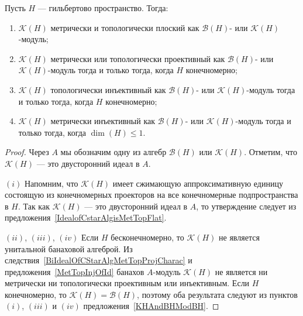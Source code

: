 \begin{proposition}\label{KHAndBHModKH} Пусть $H$ --- гильбертово пространство.
Тогда:

\begin{enumerate}[label = (\roman*)]
    \item $\mathcal{K}(H)$ метрически и топологически плоский 
    как $\mathcal{B}(H)$- или $\mathcal{K}(H)$-модуль;

    \item $\mathcal{K}(H)$ метрически или топологически проективный как
    $\mathcal{B}(H)$- или $\mathcal{K}(H)$-модуль тогда и только 
    тогда, когда $H$ конечномерно;

    \item $\mathcal{K}(H)$ топологически инъективный как $\mathcal{B}(H)$- или
    $\mathcal{K}(H)$-модуль тогда и только тогда, когда $H$ конечномерно;

    \item $\mathcal{K}(H)$ метрически инъективный как $\mathcal{B}(H)$- или
    $\mathcal{K}(H)$-модуль тогда и только тогда, когда $\dim(H)\leq 1$.
\end{enumerate}
\end{proposition}
\begin{proof} Через $A$ мы обозначим одну из алгебр $\mathcal{B}(H)$ или
$\mathcal{K}(H)$. Отметим, что $\mathcal{K}(H)$ --- это двусторонний идеал в
$A$. 

$(i)$ Напомним, что $\mathcal{K}(H)$ имеет сжимающую аппроксимативную единицу
состоящую из конечномерных проекторов на все конечномерные подпространства в
$H$. Так как $\mathcal{K}(H)$ --- это двусторонний идеал в $A$, то утверждение
следует из предложения~\ref{IdealofCstarAlgisMetTopFlat}.

$(ii)$, $(iii)$, $(iv)$ Если $H$ бесконечномерно, то $\mathcal{K}(H)$ 
не является унитальной банаховой алгеброй. Из
следствия~\ref{BiIdealOfCStarAlgMetTopProjCharac} и
предложения~\ref{MetTopInjOfId} банахов $A$-модуль $\mathcal{K}(H)$ не является
ни метрически ни топологически проективным или инъективным. Если $H$
конечномерно, то $\mathcal{K}(H)=\mathcal{B}(H)$, поэтому оба результата следуют
из пунктов $(i)$, $(iii)$ и $(iv)$ предложения~\ref{KHAndBHModBH}.
\end{proof}

